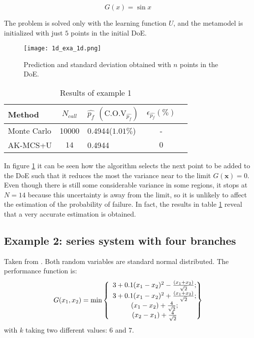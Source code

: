 \begin{equation}\label{eq:ex1}
    G(x) = \sin{x}
\end{equation}

The problem is solved only with the learning function $U$, and the metamodel is
initialized with just $5$ points in the initial DoE.


\begin{figure}[h!]
    \texttt{[image: 1d\_exa\_1d.png]}
    \caption{Prediction and standard deviation obtained with $n$ points
    in the DoE.}
    \label{fig:ex1}
\end{figure}

\begin{table}[h]
  \footnotesize%
  \begin{center}
  \begin{tabular}{lclcc}
  \toprule
  Method & $N_{call}$  & $\widehat{p_f}$ $(\text{C.O.V}_{\widehat{p_f}})$ &$\epsilon_{\widehat{p_f}}(\%)$  \\
  \midrule
  Monte Carlo   & \num[round-precision=1,round-mode=figures]{10000} & \num{0.4944}($1.01\%$) & - \\
  AK-MCS+U & $14$ & \num{0.4944} & $0$ \\
  \bottomrule
  \end{tabular}
  \end{center}
  \caption{Results of example 1}
  \label{tab:res_ex1}
\end{table}

In figure \ref{fig:ex1} it can be seen how the algorithm selects the next point to
be added to the DoE such that it reduces the most the variance near to the limit 
$G(\bm{x}) = 0$. Even though there is still some considerable variance in some regions,
it stops at $N = 14$ because this uncertainty is away from the limit, so it is
unlikely to affect the estimation of the probability of failure.
In fact, the results in table \ref{tab:res_ex1} reveal that a very accurate estimation
is obtained.

\subsection{Example 2: series system with four branches}
Taken from
\citep{Echard2011}. Both random variables
are standard normal distributed. The performance function is:
\begin{equation}
    G(x_1, x_2) = \text{min}
    \left\lbrace
    \begin{array}{c@{}l}
      3 + 0.1(x_1-x_2)^2 - \frac{(x_1+x_2)}{\sqrt{2}}; \\
      3 + 0.1(x_1-x_2)^2 + \frac{(x_1+x_2)}{\sqrt{2}}; \\
      (x_1-x_2) + \frac{4}{\sqrt{2}}; \\
      (x_2-x_1) + \frac{4}{\sqrt{2}}
    \end{array}
    \right\rbrace
  \end{equation}
with $k$ taking two different values: $6$ and $7$.

